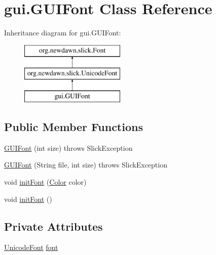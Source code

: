 \hypertarget{classgui_1_1_g_u_i_font}{}\section{gui.\+G\+U\+I\+Font Class Reference}
\label{classgui_1_1_g_u_i_font}
Inheritance diagram for gui.\+G\+U\+I\+Font\+:\begin{figure}[H]
\begin{center}
\leavevmode
\includegraphics[height=3.000000cm]{classgui_1_1_g_u_i_font}
\end{center}
\end{figure}
\subsection*{Public Member Functions}
\begin{DoxyCompactItemize}
\item 
\mbox{\hyperlink{classgui_1_1_g_u_i_font_a5d39053888fa6b4733bc8b8c79a569c9}{G\+U\+I\+Font}} (int size)  throws Slick\+Exception
\item 
\mbox{\hyperlink{classgui_1_1_g_u_i_font_afd76649be6fa65d97f57aa6893a39cfa}{G\+U\+I\+Font}} (String file, int size)  throws Slick\+Exception
\item 
void \mbox{\hyperlink{classgui_1_1_g_u_i_font_ae1fccb6783e7c0f11fdcedd36362585d}{init\+Font}} (\mbox{\hyperlink{classorg_1_1newdawn_1_1slick_1_1_color}{Color}} color)
\item 
void \mbox{\hyperlink{classgui_1_1_g_u_i_font_a9574a15bcf70de6646aa6f5c51ea2d5a}{init\+Font}} ()
\end{DoxyCompactItemize}
\subsection*{Private Attributes}
\begin{DoxyCompactItemize}
\item 
\mbox{\hyperlink{classorg_1_1newdawn_1_1slick_1_1_unicode_font}{Unicode\+Font}} \mbox{\hyperlink{classgui_1_1_g_u_i_font_a42eef190580119d94deeee2a9fa2a927}{font}}
\end{DoxyCompactItemize}


